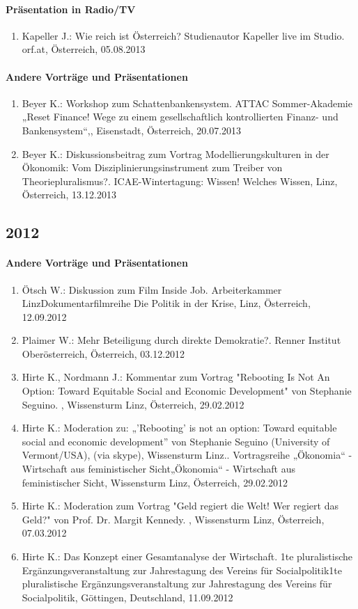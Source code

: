 \paragraph{Präsentation in Radio/TV}
\begin{enumerate}
	\item Kapeller J.: Wie reich ist Österreich? Studienautor Kapeller live im Studio. orf.at, Österreich, 05.08.2013
\end{enumerate}
\paragraph{Andere Vorträge und Präsentationen}
\begin{enumerate}
	\item Beyer K.: Workshop zum Schattenbankensystem. ATTAC Sommer-Akademie „Reset Finance! Wege zu einem gesellschaftlich kontrollierten Finanz- und Bankensystem“,, Eisenstadt, Österreich, 20.07.2013
	\item Beyer K.: Diskussionsbeitrag zum Vortrag Modellierungskulturen in der Ökonomik: Vom Disziplinierungsinstrument zum Treiber von Theoriepluralismus?. ICAE-Wintertagung: Wissen! Welches Wissen, Linz, Österreich, 13.12.2013
\end{enumerate}
\subsection*{2012}

    \paragraph{Andere Vorträge und Präsentationen}
\begin{enumerate}
	\item Ötsch W.: Diskussion zum Film Inside Job. Arbeiterkammer LinzDokumentarfilmreihe Die Politik in der Krise, Linz, Österreich, 12.09.2012
	\item Plaimer W.: Mehr Beteiligung durch direkte Demokratie?. Renner Institut Oberösterreich, Österreich, 03.12.2012
	\item Hirte K., Nordmann J.: Kommentar zum Vortrag "Rebooting Is Not An Option: Toward Equitable Social and Economic Development" von Stephanie Seguino. , Wissensturm Linz, Österreich, 29.02.2012
	\item Hirte K.: Moderation zu: „’Rebooting’ is not an option: Toward equitable social and economic development” von Stephanie Seguino (University of Vermont/USA), (via skype), Wissensturm Linz.. Vortragsreihe „Ökonomia“ - Wirtschaft aus feministischer Sicht„Ökonomia“ - Wirtschaft aus feministischer Sicht, Wissensturm Linz, Österreich, 29.02.2012
	\item Hirte K.: Moderation zum Vortrag "Geld regiert die Welt! Wer regiert das Geld?" von Prof. Dr. Margit Kennedy. , Wissensturm Linz, Österreich, 07.03.2012
	\item Hirte K.: Das Konzept einer Gesamtanalyse der Wirtschaft. 1te pluralistische Ergänzungsveranstaltung zur Jahrestagung des Vereins für Socialpolitik1te pluralistische Ergänzungsveranstaltung zur Jahrestagung des Vereins für Socialpolitik, Göttingen, Deutschland, 11.09.2012
\end{enumerate}
